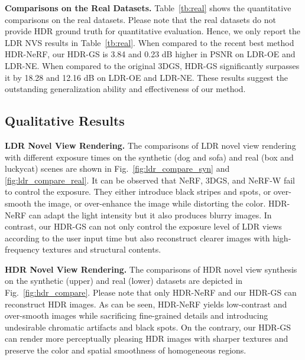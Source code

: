 \documentclass{article}
\begin{document}
\noindent \textbf{Comparisons on the Real Datasets.} Table~\ref{tb:real} shows the quantitative comparisons on the real datasets. Please note that the real datasets do not provide HDR ground truth for quantitative evaluation. Hence, we only report the LDR NVS results in Table~\ref{tb:real}. When compared to the recent best method HDR-NeRF, our HDR-GS is 3.84 and 0.23 dB higher in PSNR on LDR-OE and LDR-NE. When compared to the original 3DGS, HDR-GS significantly surpasses it by 18.28 and 12.16 dB on LDR-OE and LDR-NE. These results suggest the outstanding generalization ability and effectiveness of our method.





\subsection{Qualitative Results}

\noindent \textbf{LDR Novel View Rendering.} The comparisons of LDR novel view rendering with different exposure times on the synthetic  (dog and sofa) and real (box and luckycat) scenes are shown in Fig.~\ref{fig:ldr_compare_syn} and \ref{fig:ldr_compare_real}. It can be observed that NeRF, 3DGS, and NeRF-W fail to control the exposure. They either introduce black stripes and spots, or over-smooth the image, or over-enhance the image while distorting the color. HDR-NeRF can adapt the light intensity but it also produces blurry images. In contrast, our HDR-GS can not only control the exposure level of LDR views according to the user input time but also reconstruct clearer images with high-frequency textures and structural contents.



\noindent \textbf{HDR Novel View Rendering.} The comparisons of HDR novel view synthesis on the synthetic (upper) and real (lower) datasets are depicted in Fig.~\ref{fig:hdr_compare}. Please note that only HDR-NeRF and our HDR-GS can reconstruct HDR images. %
As can be seen, HDR-NeRF yields low-contrast and over-smooth images while sacrificing fine-grained details and introducing undesirable chromatic artifacts and black spots. On the contrary, our HDR-GS can render more perceptually pleasing HDR images with sharper textures and preserve the color and spatial smoothness of homogeneous regions.
\end{document}
